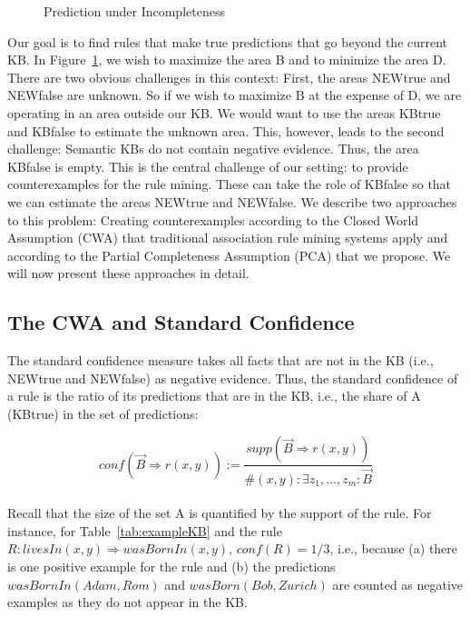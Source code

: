 \begin{figure}[h]
\caption{Prediction under Incompleteness}

\label{fig:prediction}
\end{figure}

Our goal is to find rules that make true predictions that go beyond the current KB.
In Figure~\ref{fig:prediction}, we wish to maximize the area B and to minimize the area D.
There are two obvious challenges in this context: First, the areas NEWtrue and NEWfalse are unknown.
So if we wish to maximize B at the expense of D, we are operating in an area outside our KB.
We would want to use the areas KBtrue and KBfalse to estimate the unknown area.
This, however, leads to the second challenge: Semantic KBs do not contain negative evidence.
Thus, the area KBfalse is empty.
This is the central challenge of our setting: to provide counterexamples for the rule mining.
These can take the role of KBfalse so that we can estimate the areas NEWtrue and NEWfalse.
We describe two approaches to this problem:
Creating counterexamples according to the Closed World Assumption (CWA) that traditional association rule mining systems apply and according to the Partial Completeness Assumption (PCA) that we propose.
We will now present these approaches in detail.



\subsection{The CWA and Standard Confidence} \label{subsubsec:stdConf}
The standard confidence measure takes all facts that are not in the KB (i.e., NEWtrue and NEWfalse) as negative evidence.
Thus, the standard confidence of a rule is the ratio of its predictions that are in the KB, i.e., the share of A (KBtrue) 
in the set of predictions:

\[conf(\vec{B} \Rightarrow r(x,y)) := \frac{supp(\vec{B} \Rightarrow r(x,y))}{\#(x,y): \exists z_1,...,z_m: \vec{B}}\]\\

\noindent Recall that the size of the set A is quantified by the support of the rule.
For instance, for Table~\ref{tab:exampleKB} and the rule $R:livesIn(x,y)\Rightarrow wasBornIn(x,y)$,
$conf(R)=1/3$, i.e., because (a) there is one positive example for the rule and (b) the predictions 
$wasBornIn(Adam, Rom)$ and $wasBorn(Bob,Zurich)$ are counted as negative examples as they do not appear in the KB.

